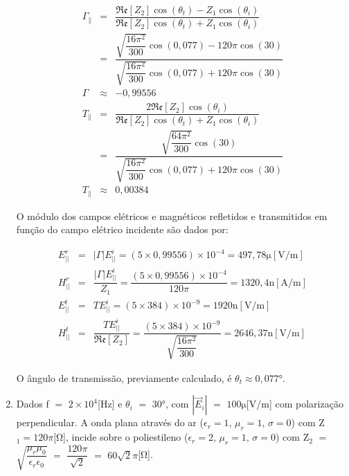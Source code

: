 \begin{enumerate}[1.]
\begin{eqnarray*}
\Gamma_{\parallel} & = & \dfrac{\mathfrak{Re}[Z_{2}]\cos(\theta_{t}) - Z_{1}\cos(\theta_{i})}{\mathfrak{Re}[Z_{2}]\cos(\theta_{t}) + Z_{1}\cos(\theta_{i})} \nonumber \\
& = & \dfrac{\sqrt{\dfrac{16\pi^{2}}{300}}\cos(0,077) - 120\pi\cos(30)}{\sqrt{\dfrac{16\pi^{2}}{300}}\cos(0,077) + 120\pi\cos(30)} \nonumber \\
\Gamma & \approx & -0,99556 \nonumber \\
T_{\parallel} & = & \dfrac{2\mathfrak{Re}[Z_{2}]\cos(\theta_{i})}{\mathfrak{Re}[Z_{2}]\cos(\theta_{t}) + Z_{1}\cos(\theta_{i})} \nonumber \\
& = & \dfrac{\sqrt{\dfrac{64\pi^{2}}{300}}\cos(30)}{\sqrt{\dfrac{16\pi^{2}}{300}}\cos(0,077) + 120\pi\cos(30)} \nonumber \\
T_{\parallel} & \approx & 0,00384 \nonumber
\end{eqnarray*}


O módulo dos campos elétricos e magnéticos refletidos e transmitidos em função do campo elétrico incidente são dados por:

\begin{eqnarray*}
E^{r}_{||} & = & |\Gamma| E^{i}_{||} = (5 \times 0,99556) \times 10^{-4} = 497,78\si{\micro}[\si{\volt/\meter}] \nonumber \\
H^{r}_{||} & = & \dfrac{|\Gamma| E^{i}_{||}}{Z_{1}} = \dfrac{(5 \times 0,99556) \times 10^{-4}}{120\pi} = 1320,4\si{\nano}[\si{\ampere/\meter}]\nonumber \\
E^{t}_{||} & = & T E^{i}_{||} = (5 \times 384) \times 10^{-9} = 1920\si{\nano}[\si{\volt/\meter}]\nonumber \\
H^{t}_{||} & = & \dfrac{T E^{i}_{||}}{\mathfrak{Re}[Z_{2}]} = \dfrac{(5 \times 384) \times 10^{-9}}{\sqrt{\dfrac{16\pi^{2}}{300}}} = 2646,37\si{\nano}[\si{\volt/\meter}]\nonumber
\end{eqnarray*}

O ângulo de transmissão, previamente calculado, é $\theta_{t} \approx 0,077$\si{\degree}.

\newpage

\item Dados f $=$ $2 \times 10^{4}$[\si{\hertz}] e $\theta_{i}$ $=$ $30$\si{\degree}, com $|\vec{E}_{i}|$ $=$ $100\si{\micro}$[\si{\volt/\meter}] com polarização perpendicular. A onda plana através do ar ($\epsilon_{r} = 1$, $\mu_{r} = 1$, $\sigma = 0$) com Z$_{1} = 120\pi$[\si{\ohm}], incide sobre o poliestileno ($\epsilon_{r} = 2$, $\mu_{r} = 1$, $\sigma = 0$) com Z$_{2}$ $=$ $\sqrt{\dfrac{\mu_{r}\mu_{0}}{\epsilon_{r}\epsilon_{0}}}$ $=$ $\dfrac{120\pi}{\sqrt{2}}$ $=$ $60\sqrt{2}\pi$[\si{\ohm}].


\end{enumerate}
